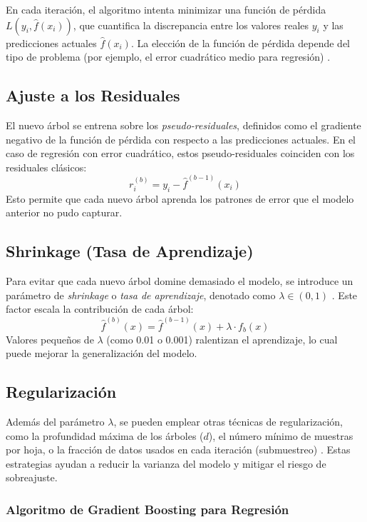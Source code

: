 En cada iteración, el algoritmo intenta minimizar una función de pérdida $L(y_i, \hat{f}(x_i))$, que cuantifica la discrepancia entre los valores reales $y_i$ y las predicciones actuales $\hat{f}(x_i)$. La elección de la función de pérdida depende del tipo de problema (por ejemplo, el error cuadrático medio para regresión) \citep{james2013}.

\subsection{Ajuste a los Residuales}

El nuevo árbol se entrena sobre los \textit{pseudo-residuales}, definidos como el gradiente negativo de la función de pérdida con respecto a las predicciones actuales. En el caso de regresión con error cuadrático, estos pseudo-residuales coinciden con los residuales clásicos:
\[
r_i^{(b)} = y_i - \hat{f}^{(b-1)}(x_i)
\]
Esto permite que cada nuevo árbol aprenda los patrones de error que el modelo anterior no pudo capturar.

\subsection{Shrinkage (Tasa de Aprendizaje)}

Para evitar que cada nuevo árbol domine demasiado el modelo, se introduce un parámetro de \textit{shrinkage} o \textit{tasa de aprendizaje}, denotado como $\lambda \in (0,1)$ \citep{james2013, veirana2021}. Este factor escala la contribución de cada árbol:
\[
\hat{f}^{(b)}(x) = \hat{f}^{(b-1)}(x) + \lambda \cdot f_b(x)
\]
Valores pequeños de $\lambda$ (como 0.01 o 0.001) ralentizan el aprendizaje, lo cual puede mejorar la generalización del modelo.

\subsection{Regularización}

Además del parámetro $\lambda$, se pueden emplear otras técnicas de regularización, como la profundidad máxima de los árboles ($d$), el número mínimo de muestras por hoja, o la fracción de datos usados en cada iteración (submuestreo) \citep{james2013}. Estas estrategias ayudan a reducir la varianza del modelo y mitigar el riesgo de sobreajuste.

\subsubsection{Algoritmo de Gradient Boosting para Regresión}

